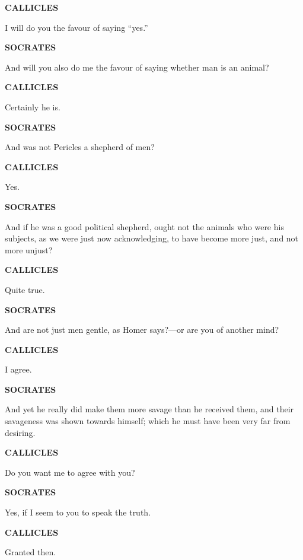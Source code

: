 \documentclass[11pt,letter]{article}
\begin{document}
\par \textbf{CALLICLES}
\par   I will do you the favour of saying “yes.”

\par \textbf{SOCRATES}
\par   And will you also do me the favour of saying whether man is an animal?

\par \textbf{CALLICLES}
\par   Certainly he is.

\par \textbf{SOCRATES}
\par   And was not Pericles a shepherd of men?

\par \textbf{CALLICLES}
\par   Yes.

\par \textbf{SOCRATES}
\par   And if he was a good political shepherd, ought not the animals who were his subjects, as we were just now acknowledging, to have become more just, and not more unjust?

\par \textbf{CALLICLES}
\par   Quite true.

\par \textbf{SOCRATES}
\par   And are not just men gentle, as Homer says?—or are you of another mind?

\par \textbf{CALLICLES}
\par   I agree.

\par \textbf{SOCRATES}
\par   And yet he really did make them more savage than he received them, and their savageness was shown towards himself; which he must have been very far from desiring.

\par \textbf{CALLICLES}
\par   Do you want me to agree with you?

\par \textbf{SOCRATES}
\par   Yes, if I seem to you to speak the truth.

\par \textbf{CALLICLES}
\par   Granted then.
\end{document}

